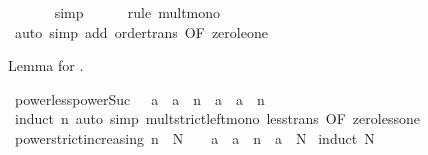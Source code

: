 \begin{isabellebody}
\ \ \ \ \ \isamarkupfalse%
\ simp\isanewline
\ \ \ \ \isamarkupfalse%
\ {\isacharparenleft}{\kern0pt}rule\ mult{\isacharunderscore}{\kern0pt}mono{\isacharparenright}{\kern0pt}\isanewline
\ \ \ \ \ \ \ \isamarkupfalse%
\ {\isacharparenleft}{\kern0pt}auto\ simp\ add{\isacharcolon}{\kern0pt}\ order{\isacharunderscore}{\kern0pt}trans\ {\isacharbrackleft}{\kern0pt}OF\ zero{\isacharunderscore}{\kern0pt}le{\isacharunderscore}{\kern0pt}one{\isacharbrackright}{\kern0pt}{\isacharparenright}{\kern0pt}\isanewline
\ \ \ \ \isamarkupfalse%
\isanewline
{}\isamarkupfalse%
%
\endisatagproof
{\isafoldproof}%
%
\isadelimproof
%
\endisadelimproof
%
\begin{isamarkuptext}%
Lemma for .%
\end{isamarkuptext}\isamarkuptrue%
\isamarkupfalse%
\ power{\isacharunderscore}{\kern0pt}less{\isacharunderscore}{\kern0pt}power{\isacharunderscore}{\kern0pt}Suc{\isacharcolon}{\kern0pt}\ {\isachardoublequoteopen}{}\ {\isacharless}{\kern0pt}\ a\ {\isasymLongrightarrow}\ a\ {\isacharcircum}{\kern0pt}\ n\ {\isacharless}{\kern0pt}\ a\ {\isacharasterisk}{\kern0pt}\ a\ {\isacharcircum}{\kern0pt}\ n{\isachardoublequoteclose}\isanewline
%
\isadelimproof
\ \ %
\endisadelimproof
%
\isatagproof
{}\isamarkupfalse%
\ {\isacharparenleft}{\kern0pt}induct\ n{\isacharparenright}{\kern0pt}\ {\isacharparenleft}{\kern0pt}auto\ simp{\isacharcolon}{\kern0pt}\ mult{\isacharunderscore}{\kern0pt}strict{\isacharunderscore}{\kern0pt}left{\isacharunderscore}{\kern0pt}mono\ less{\isacharunderscore}{\kern0pt}trans\ {\isacharbrackleft}{\kern0pt}OF\ zero{\isacharunderscore}{\kern0pt}less{\isacharunderscore}{\kern0pt}one{\isacharbrackright}{\kern0pt}{\isacharparenright}{\kern0pt}%
\endisatagproof
{\isafoldproof}%
%
\isadelimproof
\isanewline
%
\endisadelimproof
\isanewline
{}\isamarkupfalse%
\ power{\isacharunderscore}{\kern0pt}strict{\isacharunderscore}{\kern0pt}increasing{\isacharcolon}{\kern0pt}\ {\isachardoublequoteopen}n\ {\isacharless}{\kern0pt}\ N\ {\isasymLongrightarrow}\ {}\ {\isacharless}{\kern0pt}\ a\ {\isasymLongrightarrow}\ a\ {\isacharcircum}{\kern0pt}\ n\ {\isacharless}{\kern0pt}\ a\ {\isacharcircum}{\kern0pt}\ N{\isachardoublequoteclose}\isanewline
%
\isadelimproof
%
\endisadelimproof
%
\isatagproof
{}\isamarkupfalse%
\ {\isacharparenleft}{\kern0pt}induct\ N{\isacharparenright}{\kern0pt}\isanewline

\end{isabellebody}
